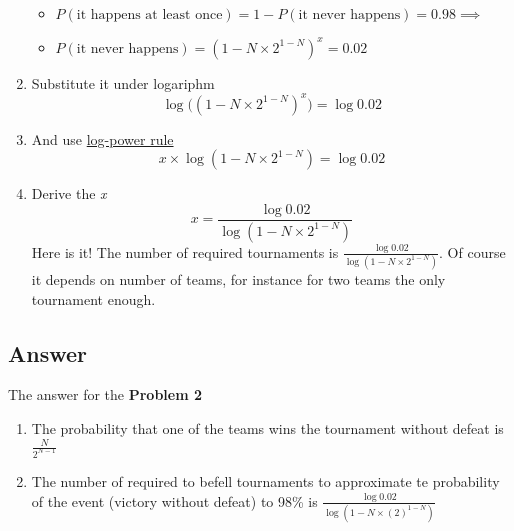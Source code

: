 \documentclass[14pt, a4paper]{extarticle}
\begin{document}
\begin{enumerate}
\begin{itemize}
        \item \(P(\text{it happens at least once}) = 1 - P(\text{it never happens}) = 0.98 \implies \)
        \item \(P(\text{it never happens}) = \left(1 - N \times 2^{1 - N}\right)^x = 0.02\)
    \end{itemize}
    \item Substitute it under logariphm
    \[
        \log \bigl(\left(1 - N \times 2^{1 - N}\right)^x\bigr) = \log 0.02     
    \]
    \item And use \href{https://www.rapidtables.com/math/algebra/logarithm/Logarithm_Rules.html#power%20rule}{log-power rule}
    \[
        x \times \log \left(1 - N \times 2^{1 - N}\right) = \log 0.02
    \]
    \item Derive the \emph{x}
    \[
        x = \frac{\log 0.02}{\log \left(1 - N \times 2^{1 - N}\right)}  
    \]
    Here is it! The number of required tournaments is \(\frac{\log 0.02}{\log \left(1 - N \times 2^{1 - N}\right)} \).
    Of course it depends on number of teams, for instance for two teams the only tournament enough.
    
\end{enumerate}

\subsection*{Answer}
The answer for the \textbf{Problem 2}

\begin{enumerate}
    \item The probability that one of the teams wins the tournament without defeat is \(\frac{N}{2^{N-1}}\)
    \item The number of required to befell tournaments to approximate te probability of the event (victory without defeat) to 98\% is 
    \(\frac{\log 0.02}{\log \left(1 - N \times (2)^{1 - N}\right)}\)
\end{enumerate}
\end{document}
